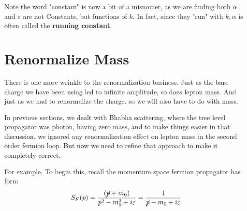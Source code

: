 Note the word "constant" is now a bit of a misnomer, as we are finding both $\alpha$ and $e$ are not Constants, but functions of $k$. In fact, since they "run" with $k, \alpha$ is often called the \textbf{running constant}.

\section{Renormalize Mass}
There is one more wrinkle to the renormalization business. Just as the bare charge we have been using led to infinite amplitude, so does lepton mass. And just as we had to renormalize the charge. so we will also have to do with mass.

In previous sections, we dealt with Bhabha scattering, where the tree level propagator was photon, having zero mass, and to make things easier in that discussion, we ignored any renormalization effect on lepton mass in the second order fermion loop. But now we need to refine that approach to make it completely correct.

For example,  To begin this, recall the momentum space fermion propagator has form
\begin{equation}
S_{F}(p)=\frac{\left(\cancel{p}+m_{0}\right)}{p^{2}-m_{0}^{2}+i \varepsilon}=\frac{1}{\cancel{p}-m_{0}+i \varepsilon}\end{equation}


